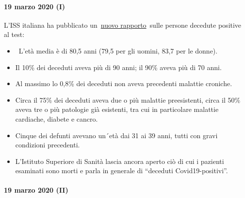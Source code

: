 \hypertarget{19-marzo-2020-i}{%
\paragraph{19 marzo 2020 (I)}\label{19-marzo-2020-i}}

L'ISS italiana ha pubblicato
un~\href{https://www.epicentro.iss.it/coronavirus/bollettino/Report-COVID-2019_17_marzo-v2.pdf}{nuovo
rapporto}~sulle persone decedute positive al test:

\begin{itemize}
\tightlist
\item
  ~L'età media è di 80,5 anni (79,5 per gli uomini, 83,7 per le donne).
\item
  Il 10\% dei deceduti aveva più di 90 anni; il 90\% aveva più di 70
  anni.
\item
  Al massimo lo 0,8\% dei deceduti non aveva precedenti malattie
  croniche.
\item
  Circa il 75\% dei deceduti aveva due o più malattie preesistenti,
  circa il 50\% aveva tre o più patologie già esistenti, tra cui in
  particolare malattie cardiache, diabete e cancro.
\item
  Cinque dei defunti avevano un´età dai 31 ai 39 anni, tutti con gravi
  condizioni precedenti.
\item
  L'Istituto Superiore di Sanità lascia ancora aperto ciò di cui i
  pazienti esaminati sono morti e parla in generale di ``deceduti
  Covid19-positivi''.
\end{itemize}

\hypertarget{19-marzo-2020-ii}{%
\paragraph{19 marzo 2020 (II)}\label{19-marzo-2020-ii}}

